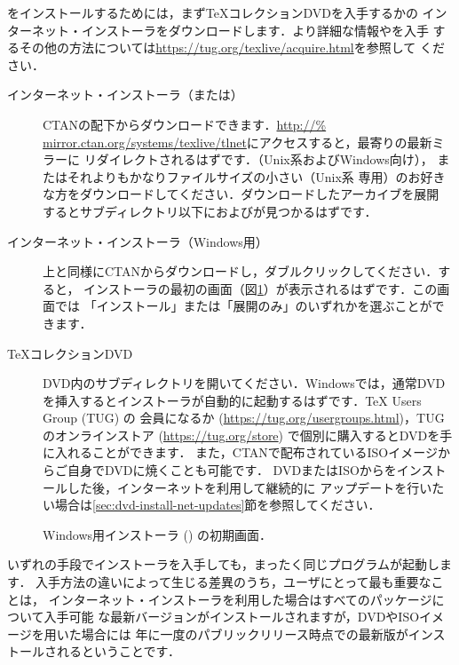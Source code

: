 \documentclass[uplatex,dvipdfmx,tombow]{jsarticle}
\begin{document}
\TL をインストールするためには，まず\TeX コレクションDVDを入手するか\TL の
インターネット・インストーラをダウンロードします．より詳細な情報や\TL を入手
するその他の方法については\url{https://tug.org/texlive/acquire.html}を参照して
ください．
%
\begin{description}
\item[インターネット・インストーラ（または）]
CTANの配下からダウンロードできます．\url{http://%
mirror.ctan.org/systems/texlive/tlnet}にアクセスすると，最寄りの最新ミラーに
リダイレクトされるはずです．（Unix系およびWindows向け），
またはそれよりもかなりファイルサイズの小さい（Unix系
専用）のお好きな方をダウンロードしてください．ダウンロードしたアーカイブを展開
するとサブディレクトリ以下におよびが見つかるはずです．

\item[インターネット・インストーラ（Windows用）]
上と同様にCTANからダウンロードし，ダブルクリックしてください．すると，
インストーラの最初の画面（図\ref{fig:nsis}）が表示されるはずです．この画面では
「インストール」または「展開のみ」のいずれかを選ぶことができます．

\item[\TeX コレクションDVD]
DVD内のサブディレクトリを開いてください．Windowsでは，通常DVD
を挿入するとインストーラが自動的に起動するはずです．{\TeX} Users Group (TUG) の
会員になるか (\url{https://tug.org/usergroups.html})，TUGのオンラインストア
(\url{https://tug.org/store}) で個別に購入するとDVDを手に入れることができます．
また，CTANで配布されているISOイメージからご自身でDVDに焼くことも可能です．
DVDまたはISOから\TL をインストールした後，インターネットを利用して継続的に
アップデートを行いたい場合は\ref{sec:dvd-install-net-updates}節を参照してください．
\end{description}
%
\begin{figure}[tb]
\caption{Windows用インストーラ () の初期画面．}
\label{fig:nsis}
\end{figure}

いずれの手段でインストーラを入手しても，まったく同じプログラムが起動します．
入手方法の違いによって生じる差異のうち，ユーザにとって最も重要なことは，
インターネット・インストーラを利用した場合はすべてのパッケージについて入手可能
な最新バージョンがインストールされますが，DVDやISOイメージを用いた場合には
年に一度のパブリックリリース時点での最新版がインストールされるということです．
\end{document}
